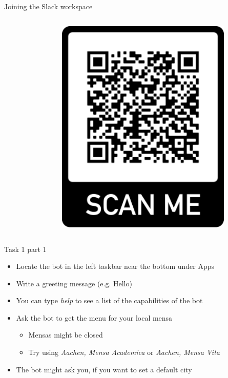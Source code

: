 \begin{frame}{Joining the Slack workspace}
\begin{columns}
\begin{column}[]{0.7\textwidth}
    \end{column}
    \begin{column}[]{0.3\textwidth}
      \begin{figure}
        \centering
        \includegraphics[width=0.9\textwidth]{frame.png}
      \end{figure}
    \end{column}
  \end{columns}
  
\end{frame}


\begin{frame}{Task 1 part 1}
  \begin{itemize}
    \item Locate the bot in the left taskbar near the bottom under Apps
    \item Write a greeting message (e.g. Hello)
    \item You can type \emph{help} to see a list of the capabilities of the bot
    \item Ask the bot to get the menu for your local mensa
    \begin{itemize}
      \item Mensas might be closed
      \item Try using \emph{Aachen, Mensa Academica} or \emph{Aachen, Mensa Vita}
    \end{itemize}
    \item The bot might ask you, if you want to set a default city
  \end{itemize}
\end{frame}

